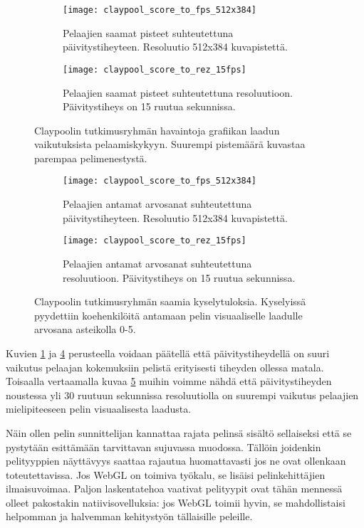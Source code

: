\begin{figure}[h]
    \begin{subfigure}{0.5\textwidth}
        \texttt{[image: claypool\_score\_to\_fps\_512x384]}
        \caption{\label{fig:claypool_performance:fps}Pelaajien saamat pisteet suhteutettuna päivitystiheyteen. Resoluutio 512x384 kuvapistettä.}
    \end{subfigure}
    \begin{subfigure}{0.5\textwidth}
        \texttt{[image: claypool\_score\_to\_rez\_15fps]}
        \caption{\label{fig:claypool_performance:rez}Pelaajien saamat pisteet suhteutettuna resoluutioon. Päivitystiheys on 15 ruutua sekunnissa.}
    \end{subfigure}
    \caption{\label{fig:claypool_performance}Claypoolin tutkimusryhmän\cite{claypool_fps} havaintoja grafiikan laadun vaikutuksista pelaamiskykyyn. Suurempi pistemäärä kuvastaa parempaa pelimenestystä.}
\end{figure}
\begin{figure}[h]
    \begin{subfigure}{0.5\textwidth}
        \texttt{[image: claypool\_score\_to\_fps\_512x384]}
        \caption{\label{fig:claypool_quality:fps}Pelaajien antamat arvosanat suhteutettuna päivitystiheyteen. Resoluutio 512x384 kuvapistettä.}
    \end{subfigure}
    \begin{subfigure}{0.5\textwidth}
        \texttt{[image: claypool\_score\_to\_rez\_15fps]}
        \caption{\label{fig:claypool_quality:rez}Pelaajien antamat arvosanat suhteutettuna resoluutioon. Päivitystiheys on 15 ruutua sekunnissa.}
    \end{subfigure}
    \caption{\label{fig:claypool_quality}Claypoolin tutkimusryhmän\cite{claypool_fps} saamia kyselytuloksia. Kyselyissä pyydettiin koehenkilöitä antamaan pelin visuaaliselle laadulle arvosana asteikolla 0-5.}
\end{figure}

Kuvien \ref{fig:claypool_performance:fps} ja \ref{fig:claypool_quality:fps} perusteella voidaan päätellä että päivitystiheydellä on suuri vaikutus pelaajan kokemuksiin pelistä erityisesti tiheyden ollessa matala. Toisaalla vertaamalla kuvaa \ref{fig:claypool_quality:rez} muihin voimme nähdä että päivitystiheyden noustessa yli 30 ruutuun sekunnissa resoluutiolla on suurempi vaikutus pelaajien mielipiteeseen pelin visuaalisesta laadusta\cite{claypool_fps}. 

Näin ollen pelin sunnittelijan kannattaa rajata pelinsä sisältö sellaiseksi että se pystytään esittämään tarvittavan sujuvassa muodossa. Tällöin joidenkin pelityyppien näyttävyys saattaa rajautua huomattavasti jos ne ovat ollenkaan toteutettavissa. Jos WebGL on toimiva työkalu, se lisäisi pelinkehittäjien ilmaisuvoimaa. Paljon laskentatehoa vaativat pelityypit ovat tähän mennessä olleet pakostakin natiivisovelluksia: jos WebGL toimii hyvin, se mahdollistaisi helpomman ja halvemman kehitystyön tällaisille peleille.